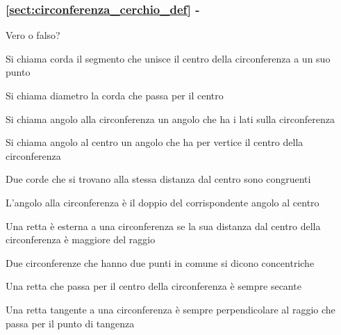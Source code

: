\begingroup
\hypersetup{linkcolor=black}
\subsubsection*{\ref{sect:circonferenza_cerchio_def} - }
\endgroup

\begin{esercizio}
\label{ese:5.5}
Vero o falso?
\begin{enumeratea}
\item Si chiama corda il segmento che unisce il centro della circonferenza a un suo punto\tab\hfill\boxV\quad\boxF
\item Si chiama diametro la corda che passa per il centro\hfill\boxV\quad\boxF
\item Si chiama angolo alla circonferenza un angolo che ha i lati sulla circonferenza\hfill\boxV\quad\boxF
\item Si chiama angolo al centro un angolo che ha per vertice il centro della circonferenza\tab\hfill\boxV\quad\boxF
\item Due corde che si trovano alla stessa distanza dal centro sono congruenti\hfill\boxV\quad\boxF
\item L'angolo alla circonferenza è il doppio del corrispondente angolo al centro\hfill\boxV\quad\boxF
\item Una retta è esterna a una circonferenza se la sua distanza dal centro della circonferenza è maggiore del raggio\hfill\boxV\quad\boxF
\item Due circonferenze che hanno due punti in comune si dicono concentriche\hfill\boxV\quad\boxF
\item Una retta che passa per il centro della circonferenza è sempre secante\hfill\boxV\quad\boxF
\item Una retta tangente a una circonferenza è sempre perpendicolare al raggio che passa per il punto di tangenza\hfill\boxV\quad\boxF
\end{enumeratea}
\end{esercizio}

